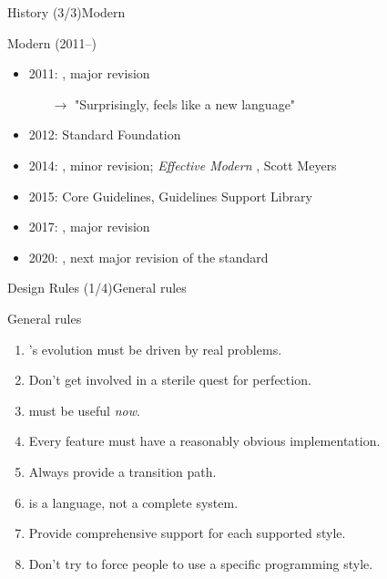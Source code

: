 \begin{frame}{\CCLang History (3/3)}{Modern \CCLang}
  \begin{block}{Modern \CCLang (2011--)}
    \begin{itemize}
    \item
      2011: , major revision
      \begin{itemize}
      \item[$\to$]
        "Surprisingly,  feels like a new language"
      \end{itemize}
    \item
      2012: Standard \CCLang Foundation
    \item
      2014: , minor revision; \emph{Effective Modern \CCLang}, Scott Meyers
    \item
      2015: \CCLang Core Guidelines, Guidelines Support Library
    \item
      2017: , major revision
    \item
      2020: , next major revision of the standard
    \end{itemize}
  \end{block}
\end{frame}

\begin{frame}{Design Rules (1/4)}{General rules}
  \begin{block}{General rules}
    \begin{enumerate}
    \item
      \CCLang's evolution must be driven by real problems.
    \item
      Don't get involved in a sterile quest for perfection.
    \item
      \CCLang must be useful \emph{now}.
    \item
      Every feature must have a reasonably obvious implementation.
    \item
      Always provide a transition path.
    \item
      \CCLang is a language, not a complete system.
    \item
      Provide comprehensive support for each supported style.
    \item
      Don't try to force people to use a specific programming style.
    \end{enumerate}
  \end{block}
\end{frame}

